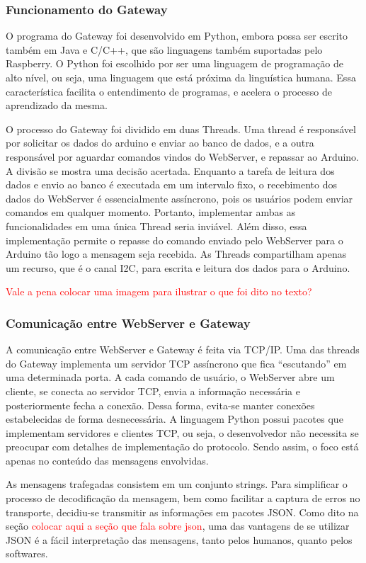 			\subsubsection{Funcionamento do Gateway}
				\label{sec:met_gateway}
				O programa do Gateway foi desenvolvido em Python, embora possa ser escrito também em Java e C/C++, que são linguagens também suportadas pelo Raspberry. O Python foi escolhido por ser uma linguagem de programação de alto nível, ou seja, uma linguagem que está próxima da linguística humana. Essa característica facilita o entendimento de programas, e acelera o processo de aprendizado da mesma.
				
				O processo do Gateway foi dividido em duas Threads. Uma thread é responsável por solicitar os dados do arduino e enviar ao banco de dados, e a outra responsável por aguardar comandos vindos do WebServer, e repassar ao Arduino. A divisão se mostra uma decisão acertada. Enquanto a tarefa de leitura dos dados e envio ao banco é executada em um intervalo fixo, o recebimento dos dados do WebServer é essencialmente assíncrono, pois os usuários podem enviar comandos em qualquer momento. Portanto, implementar ambas as funcionalidades em uma única Thread seria inviável. Além disso, essa implementação permite o repasse do comando enviado pelo WebServer para o Arduino tão logo a mensagem seja recebida. As Threads compartilham apenas um recurso, que é o canal I2C, para escrita e leitura dos dados para o Arduino.
				
				\textcolor{red}{Vale a pena colocar uma imagem para ilustrar o que foi dito no texto?}
			
			\subsubsection{Comunicação entre WebServer e Gateway}
				A comunicação entre WebServer e Gateway é feita via TCP/IP. Uma das threads do Gateway implementa um servidor TCP assíncrono que fica ``escutando'' em uma determinada porta. A cada comando de usuário, o WebServer abre um cliente, se conecta ao servidor TCP, envia a informação necessária e posteriormente fecha a conexão. Dessa forma, evita-se manter conexões estabelecidas de forma desnecessária. A linguagem Python possui pacotes que implementam servidores e clientes TCP, ou seja, o desenvolvedor não necessita se preocupar com detalhes de implementação do protocolo. Sendo assim, o foco está apenas no conteúdo das mensagens envolvidas.
				
				As mensagens trafegadas consistem em um conjunto strings. Para simplificar o processo de decodificação da mensagem, bem como facilitar a captura de erros no transporte, decidiu-se transmitir as informações em pacotes JSON. Como dito na seção \textcolor{red}{colocar aqui a seção que fala sobre json}, uma das vantagens de se utilizar JSON é a fácil interpretação das mensagens, tanto pelos humanos, quanto pelos softwares.
				
